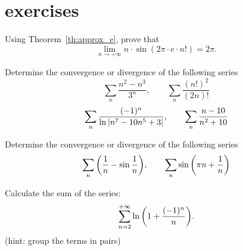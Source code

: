 \section{exercises}

\begin{exercise}
  Using Theorem~\ref{th:approx_e}, prove that
  \[
  \lim_{n\to +\infty} n \cdot \sin(2\pi \cdot e\cdot n!) = 2\pi.
  \]
\end{exercise}

\begin{exercise}
Determine the convergence or divergence of the following series
\[
    \sum_n \frac{n^2-n^3}{3^n}, \qquad
    \sum_n \frac{(n!)^2}{(2n)!}
\]
\[
\sum_n \frac{(-1)^n}{\ln{\left|n^7 - 10n^5 + 3\right|}},  \qquad
\sum_n \frac{n-10}{n^2+10}
\]
\end{exercise}
  
\begin{exercise}
  Determine the convergence or divergence of the following series
  \[
    \sum_n {\left( \frac 1 n - \sin \frac 1 n \right)},\qquad
    \sum_n \sin{\left( \pi n + \frac 1 n \right)}
  \]
\end{exercise}
  
\begin{exercise}
Calculate the sum of the series:
\[
  \sum_{n=2}^{+\infty} \ln{\left( 1+\frac{(-1)^n}{n} \right)}.
\]
(hint: group the terms in pairs)
\end{exercise}